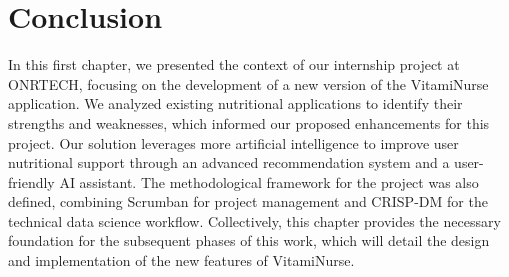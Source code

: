 \section*{Conclusion}
In this first chapter, we presented the context of our internship project
at ONRTECH, focusing on the development of a new version of the VitamiNurse application.
We analyzed existing nutritional applications to identify their
strengths and weaknesses, which informed our proposed enhancements
for this project. Our solution leverages more artificial intelligence to
improve user nutritional support through an advanced recommendation system and a
user-friendly AI assistant. The methodological framework for the project was also defined,
 combining Scrumban for project management and CRISP-DM for the technical data science workflow. 
 Collectively, this chapter provides the necessary foundation for the subsequent phases of this work, 
 which will detail the design and implementation of the new features of VitamiNurse.